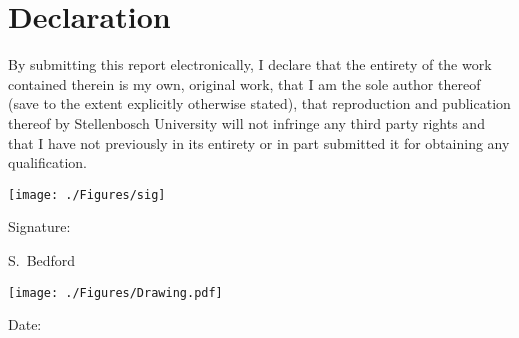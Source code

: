 \chapter{Declaration}

By submitting this report electronically, I declare that the entirety of the work contained
therein is my own, original work, that I am the sole author thereof (save to the extent
explicitly otherwise stated), that reproduction and publication thereof by Stellenbosch
University will not infringe any third party rights and that I have not previously in its
entirety or in part submitted it for obtaining any qualification.

\vspace{3cm}
\hspace{1.5cm}
\vspace{-.8cm}
\texttt{[image: ./Figures/sig]}\\
\noindent%
\parbox{.5\textwidth}{%
  Signature:\quad\dotfill\par
  \hfill S.\ Bedford\hspace{1.2cm}\null}


\vspace{1.5cm}
\hspace{2.7cm}
\vspace{-.5cm}
\texttt{[image: ./Figures/Drawing.pdf]}\\
\noindent%
\parbox{.5\textwidth}{%
  Date:\quad\dotfill\par}